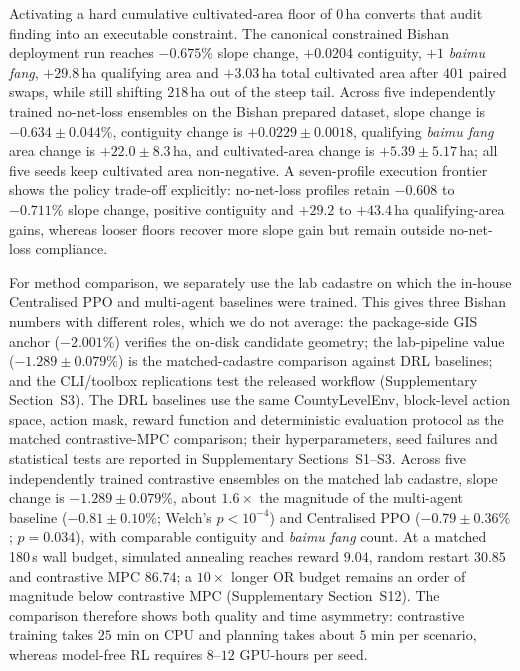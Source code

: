 \documentclass[11pt]{article}
\begin{document}
Activating a hard cumulative cultivated-area floor of $0$\,ha converts that audit finding into an executable constraint. The canonical constrained Bishan deployment run reaches $-0.675\%$ slope change, $+0.0204$ contiguity, $+1$ \textit{baimu fang}, $+29.8$\,ha qualifying area and $+3.03$\,ha total cultivated area after $401$ paired swaps, while still shifting $218$\,ha out of the steep tail. Across five independently trained no-net-loss ensembles on the Bishan prepared dataset, slope change is $-0.634 \pm 0.044\%$, contiguity change is $+0.0229 \pm 0.0018$, qualifying \textit{baimu fang} area change is $+22.0 \pm 8.3$\,ha, and cultivated-area change is $+5.39 \pm 5.17$\,ha; all five seeds keep cultivated area non-negative. A seven-profile execution frontier shows the policy trade-off explicitly: no-net-loss profiles retain $-0.608$ to $-0.711\%$ slope change, positive contiguity and $+29.2$ to $+43.4$\,ha qualifying-area gains, whereas looser floors recover more slope gain but remain outside no-net-loss compliance.

For method comparison, we separately use the lab cadastre on which the in-house Centralised PPO and multi-agent baselines were trained. This gives three Bishan numbers with different roles, which we do not average: the package-side GIS anchor ($-2.001\%$) verifies the on-disk candidate geometry; the lab-pipeline value ($-1.289 \pm 0.079\%$) is the matched-cadastre comparison against DRL baselines; and the CLI/toolbox replications test the released workflow (Supplementary Section~S3). The DRL baselines use the same CountyLevelEnv, block-level action space, action mask, reward function and deterministic evaluation protocol as the matched contrastive-MPC comparison; their hyperparameters, seed failures and statistical tests are reported in Supplementary Sections~S1--S3. Across five independently trained contrastive ensembles on the matched lab cadastre, slope change is $-1.289 \pm 0.079\%$, about $1.6\times$ the magnitude of the multi-agent baseline ($-0.81 \pm 0.10\%$; Welch's $p < 10^{-4}$) and Centralised PPO ($-0.79 \pm 0.36\%$; $p = 0.034$), with comparable contiguity and \textit{baimu fang} count. At a matched 180\,s wall budget, simulated annealing reaches reward $9.04$, random restart $30.85$ and contrastive MPC $86.74$; a $10\times$ longer OR budget remains an order of magnitude below contrastive MPC (Supplementary Section~S12). The comparison therefore shows both quality and time asymmetry: contrastive training takes $25$ min on CPU and planning takes about $5$ min per scenario, whereas model-free RL requires $8$--$12$ GPU-hours per seed.
\end{document}
